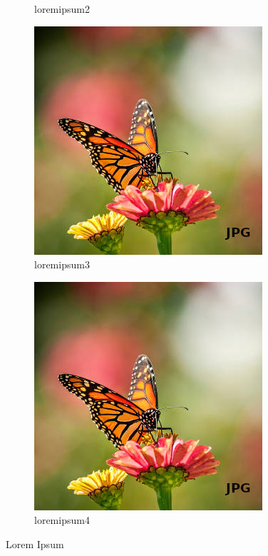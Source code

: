 \begin{figure}[h!]
\begin{subfigure}[b]{0.24\linewidth}
        \caption{loremipsum2}
        \label{fig:loremipsum2}
    \end{subfigure}
    \begin{subfigure}[b]{0.24\linewidth}
        \centering
        \includegraphics[width=\textwidth]{images/sample.jpeg}
        \caption{loremipsum3}
        \label{fig:loremipsum3}
    \end{subfigure}
    \begin{subfigure}[b]{0.24\linewidth}
        \centering
        \includegraphics[width=\textwidth]{images/sample.jpeg}
        \caption{loremipsum4}
        \label{fig:loremipsum4}
    \end{subfigure}
    \caption{Lorem Ipsum}    \label{fig:datasamples}
\end{figure}

